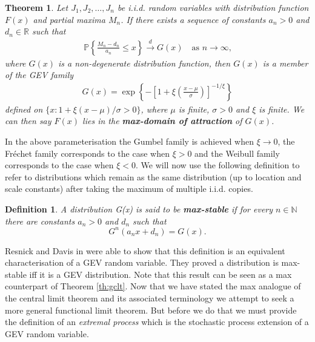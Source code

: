 \documentclass[honours,12pt,twoside, openright]{unswthesis}
\newcommand{\R}{\mathbb{R}}
\newcommand{\N}{\mathbb{N}}
\newcommand{\PP}{\mathbb{P}}
\newcommand{\1}{\mathbf 1}
\newcommand{\cd}{\overset{d}{\longrightarrow}}
\newtheorem{theorem}[equation]{Theorem}
\newtheorem{definition}[equation]{Definition}
\numberwithin{equation}{section}
\theoremstyle{definition}
\theoremstyle{remark}
\begin{document}
\begin{theorem}\cite{ColesBook}
	Let $J_1,J_2,\ldots ,J_n$ be i.i.d. random variables with distribution function $F(x)$ and partial maxima $M_n$. If there exists a sequence of constants $a_n>0$ and $d_n\in \R$ such that
	\begin{align*}
	\PP\left\{\frac{M_n-d_n}{a_n}\leq x\right\}\cd G(x)\quad\textrm{as $n\to\infty$,}
	\end{align*}	
	where $G(x)$ is a non-degenerate distribution function, then $G(x)$ is a member of the GEV family
	\begin{align}\label{eq:GEV}
		G(x)=\exp\left\{-\left[1+\xi\left(\frac{x-\mu}{\sigma}\right)\right]^{-1/\xi}\right\}
	\end{align}	
	defined on $\{x:1+\xi(x-\mu)/\sigma>0\}$, where $\mu$ is finite, $\sigma>0$ and $\xi$ is finite. We can then say $F(x)$ lies in the \textbf{max-domain of attraction} of $G(x)$.
\end{theorem}
In the above parameterisation the Gumbel family is achieved when $\xi \to 0$, the Fr\'echet family corresponds to the case when $\xi>0$ and the Weibull family corresponds to the case when $\xi<0$. We will now use the following definition to refer to distributions which remain as the same distribution (up to location and scale constants) after taking the maximum of multiple i.i.d. copies.\\
\begin{definition}\cite{BalkemaResnick1977}
A distribution G(x) is said to be \textbf{max-stable} if for every $n\in\N$ there are constants $a_n>0$ and $d_n$ such that
\[
	G^n(a_n x + d_n)= G(x).
\]
\end{definition}

\noindent Resnick and Davis in \cite{DavisResnick1984} were able to show that this definition is an equivalent characterisation of a GEV random variable. They proved a distribution is max-stable iff it is a GEV distribution. Note that this result can be seen as a max counterpart of Theorem \ref{th:gclt}. Now that we have stated the max analogue of the central limit theorem and its associated terminology we attempt to seek a more general functional limit theorem. But before we do that we must provide the definition of an \emph{extremal process} which is the stochastic process extension of a GEV random variable.\\
\end{document}
